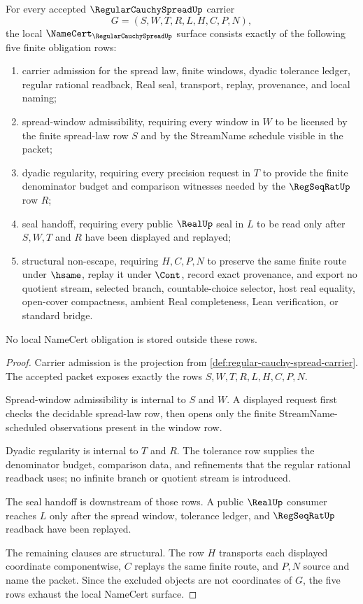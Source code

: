 \begin{theorem}
\label{thm:regular-cauchy-spread-namecert-obligations}
For every accepted $\RegularCauchySpreadUp$ carrier
$$
G=(S,W,T,R,L,H,C,P,N),
$$
the local $\NameCert_{\RegularCauchySpreadUp}$ surface consists exactly of the following five finite obligation rows:
\begin{enumerate}
\item carrier admission for the spread law, finite windows, dyadic tolerance ledger, regular rational readback, Real seal, transport, replay, provenance, and local naming;
\item spread-window admissibility, requiring every window in $W$ to be licensed by the finite spread-law row $S$ and by the StreamName schedule visible in the packet;
\item dyadic regularity, requiring every precision request in $T$ to provide the finite denominator budget and comparison witnesses needed by the $\RegSeqRatUp$ row $R$;
\item seal handoff, requiring every public $\RealUp$ seal in $L$ to be read only after $S,W,T$ and $R$ have been displayed and replayed;
\item structural non-escape, requiring $H,C,P,N$ to preserve the same finite route under $\hsame$, replay it under $\Cont$, record exact provenance, and export no quotient stream, selected branch, countable-choice selector, host real equality, open-cover compactness, ambient Real completeness, Lean verification, or standard bridge.
\end{enumerate}
No local NameCert obligation is stored outside these rows.
\end{theorem}
\begin{proof}
Carrier admission is the projection from \autoref{def:regular-cauchy-spread-carrier}. The accepted packet exposes exactly the rows $S,W,T,R,L,H,C,P,N$.

Spread-window admissibility is internal to $S$ and $W$. A displayed request first checks the decidable spread-law row, then opens only the finite StreamName-scheduled observations present in the window row.

Dyadic regularity is internal to $T$ and $R$. The tolerance row supplies the denominator budget, comparison data, and refinements that the regular rational readback uses; no infinite branch or quotient stream is introduced.

The seal handoff is downstream of those rows. A public $\RealUp$ consumer reaches $L$ only after the spread window, tolerance ledger, and $\RegSeqRatUp$ readback have been replayed.

The remaining clauses are structural. The row $H$ transports each displayed coordinate componentwise, $C$ replays the same finite route, and $P,N$ source and name the packet. Since the excluded objects are not coordinates of $G$, the five rows exhaust the local NameCert surface.
\end{proof}

